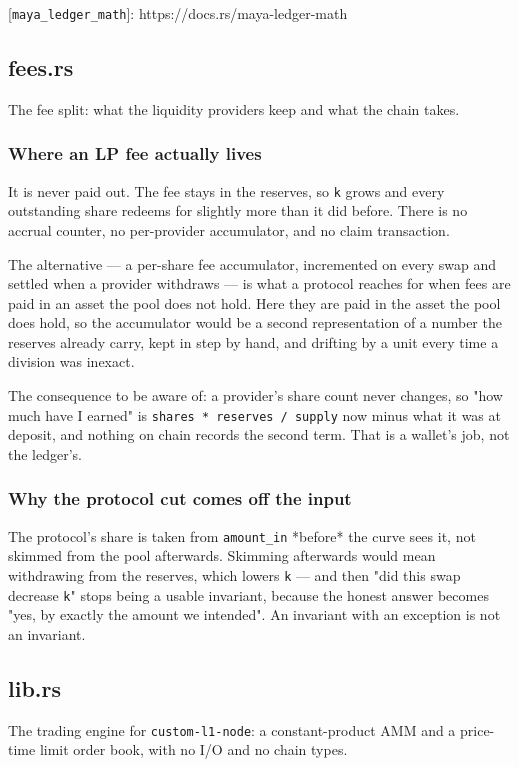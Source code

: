 \documentclass[11pt,a4paper]{article}
\begin{document}
[\texttt{maya\_ledger\_math}]: https://docs.rs/maya-ledger-math

\subsection{fees.rs}
The fee split: what the liquidity providers keep and what the chain takes.

\subsubsection{Where an LP fee actually lives}

It is never paid out. The fee stays in the reserves, so \texttt{k} grows and every
outstanding share redeems for slightly more than it did before. There is no
accrual counter, no per-provider accumulator, and no claim transaction.

The alternative — a per-share fee accumulator, incremented on every swap and
settled when a provider withdraws — is what a protocol reaches for when fees
are paid in an asset the pool does not hold. Here they are paid in the asset
the pool does hold, so the accumulator would be a second representation of a
number the reserves already carry, kept in step by hand, and drifting by a
unit every time a division was inexact.

The consequence to be aware of: a provider's share count never changes, so
"how much have I earned" is \texttt{shares * reserves / supply} now minus what it
was at deposit, and nothing on chain records the second term. That is a
wallet's job, not the ledger's.

\subsubsection{Why the protocol cut comes off the input}

The protocol's share is taken from \texttt{amount\_in} *before* the curve sees it,
not skimmed from the pool afterwards. Skimming afterwards would mean
withdrawing from the reserves, which lowers \texttt{k} — and then "did this swap
decrease \texttt{k}" stops being a usable invariant, because the honest answer
becomes "yes, by exactly the amount we intended". An invariant with an
exception is not an invariant.

\subsection{lib.rs}
The trading engine for \texttt{custom-l1-node}: a constant-product AMM and a
price-time limit order book, with no I/O and no chain types.
\end{document}
